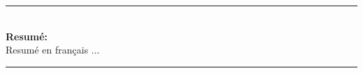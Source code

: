 \cleardoublepage
{} %
\begin{vcentrepage}
\noindent\rule[2pt]{\textwidth}{0.2pt}\\

{\large\textbf{Resumé:}\\}
Resumé en fran\c{c}ais ...

\noindent\rule[2pt]{\textwidth}{0.8pt}
\end{vcentrepage}

%

\restoregeometry
